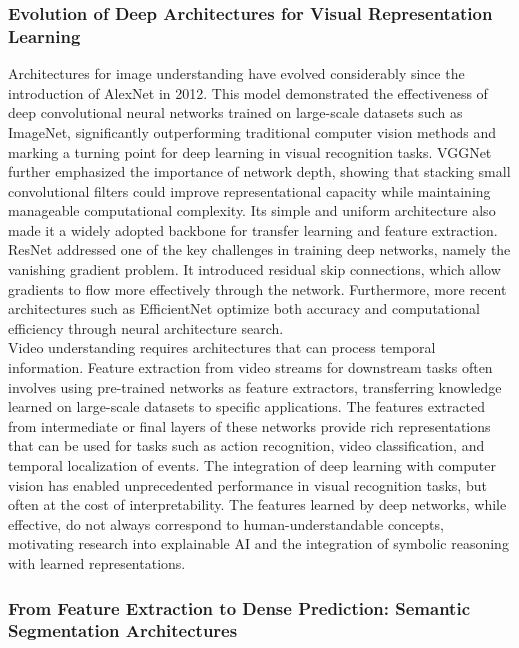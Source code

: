 \documentclass[12pt,a4paper]{report}
\begin{document}
\subsubsection{Evolution of Deep Architectures for Visual Representation Learning}
Architectures for image understanding have evolved considerably since the introduction of AlexNet in 2012\cite{chiave57}.  This model demonstrated the effectiveness of deep convolutional neural networks trained on large-scale datasets such as ImageNet, significantly outperforming traditional computer vision methods and marking a turning point for deep learning in visual recognition tasks.
VGGNet \cite{chiave58} further emphasized the importance of network depth, showing that stacking small convolutional filters could improve representational capacity while maintaining manageable computational complexity. Its simple and uniform architecture also made it a widely adopted backbone for transfer learning and feature extraction.
ResNet \cite{chiave59} addressed one of the key challenges in training deep networks, namely the vanishing gradient problem. It introduced residual skip connections, which allow gradients to flow more effectively through the network. Furthermore, more recent architectures such as EfficientNet\cite{chiave60} optimize both accuracy and computational efficiency through neural architecture search.
\\Video understanding requires architectures that can process temporal information. Feature extraction from video streams for downstream tasks often involves using pre-trained networks as feature extractors, transferring knowledge learned on large-scale datasets to specific applications. The features extracted from intermediate or final layers of these networks provide rich representations that can be used for tasks such as action recognition, video classification, and temporal localization of events.
The integration of deep learning with computer vision has enabled unprecedented performance in visual recognition tasks, but often at the cost of interpretability. The features learned by deep networks, while effective, do not always correspond to human-understandable concepts, motivating research into explainable AI and the integration of symbolic reasoning with learned representations.



\subsubsection{From Feature Extraction to Dense Prediction: Semantic Segmentation Architectures}
\end{document}
